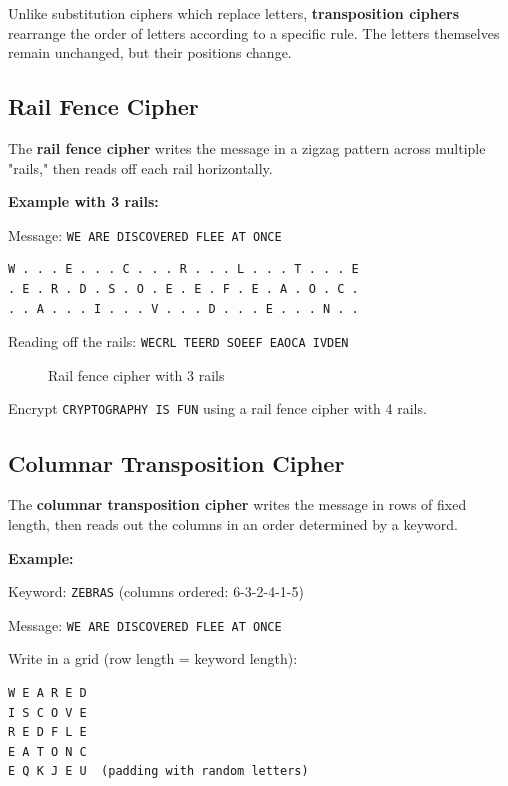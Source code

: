 \documentclass[11pt,a4paper]{report}
\begin{document}
Unlike substitution ciphers which replace letters, \textbf{transposition ciphers} rearrange the order of letters according to a specific rule. The letters themselves remain unchanged, but their positions change.

\subsection{Rail Fence Cipher}

The \textbf{rail fence cipher} writes the message in a zigzag pattern across multiple "rails," then reads off each rail horizontally.

\textbf{Example with 3 rails:}

Message: \verb|WE ARE DISCOVERED FLEE AT ONCE|

\begin{verbatim}
W . . . E . . . C . . . R . . . L . . . T . . . E
. E . R . D . S . O . E . E . F . E . A . O . C .
. . A . . . I . . . V . . . D . . . E . . . N . .
\end{verbatim}

Reading off the rails: \verb|WECRL TEERD SOEEF EAOCA IVDEN|

\begin{figure}[h]
\caption{Rail fence cipher with 3 rails}
\end{figure}

\begin{ex}
Encrypt \verb|CRYPTOGRAPHY IS FUN| using a rail fence cipher with 4 rails.
\end{ex}

\subsection{Columnar Transposition Cipher}

The \textbf{columnar transposition cipher} writes the message in rows of fixed length, then reads out the columns in an order determined by a keyword.

\textbf{Example:}

Keyword: \verb|ZEBRAS| (columns ordered: 6-3-2-4-1-5)

Message: \verb|WE ARE DISCOVERED FLEE AT ONCE|

Write in a grid (row length = keyword length):
\begin{verbatim}
W E A R E D
I S C O V E
R E D F L E
E A T O N C
E Q K J E U  (padding with random letters)
\end{verbatim}
\end{document}

